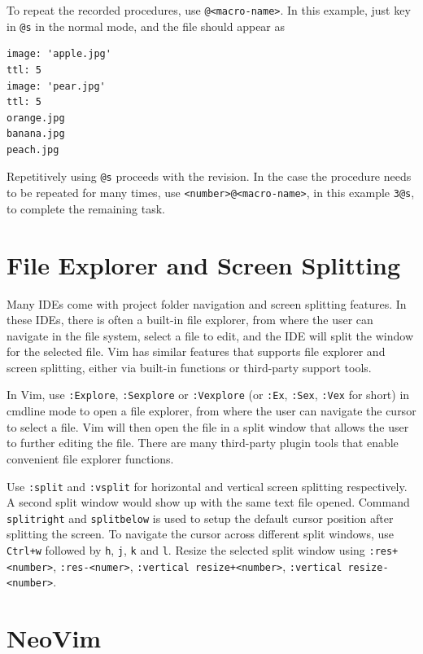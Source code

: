 To repeat the recorded procedures, use \verb|@<macro-name>|. In this example, just key in \verb|@s| in the normal mode, and the file should appear as
\begin{lstlisting}
image: 'apple.jpg'
ttl: 5
image: 'pear.jpg'
ttl: 5
orange.jpg
banana.jpg
peach.jpg
\end{lstlisting}

Repetitively using \verb|@s| proceeds with the revision. In the case the procedure needs to be repeated for many times, use \verb|<number>@<macro-name>|, in this example \verb|3@s|, to complete the remaining task.

\section{File Explorer and Screen Splitting}

Many IDEs come with project folder navigation and screen splitting features. In these IDEs, there is often a built-in file explorer, from where the user can navigate in the file system, select a file to edit, and the IDE will split the window for the selected file. Vim has similar features that supports file explorer and screen splitting, either via built-in functions or third-party support tools.

In Vim, use \verb|:Explore|, \verb|:Sexplore| or \verb|:Vexplore| (or \verb|:Ex|, \verb|:Sex|, \verb|:Vex| for short) in cmdline mode to open a file explorer, from where the user can navigate the cursor to select a file. Vim will then open the file in a split window that allows the user to further editing the file. There are many third-party plugin tools that enable convenient file explorer functions.

Use \verb|:split| and \verb|:vsplit| for horizontal and vertical screen splitting respectively. A second split window would show up with the same text file opened. Command \verb|splitright| and \verb|splitbelow| is used to setup the default cursor position after splitting the screen. To navigate the cursor across different split windows, use \verb|Ctrl+w| followed by \verb|h|, \verb|j|, \verb|k| and \verb|l|. Resize the selected split window using \verb|:res+<number>|, \verb|:res-<numer>|, \verb|:vertical resize+<number>|, \verb|:vertical resize-<number>|. 

\section{NeoVim}

